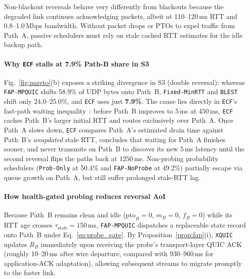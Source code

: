 \documentclass[preprint,12pt,number]{elsarticle}
\begin{document}
Non-blackout reversals behave very differently from blackouts because the degraded link continues acknowledging packets, albeit at 110--120\,ms RTT and 0.8--1.0\,Mbps bandwidth. Without packet drops or PTOs to expel traffic from Path~A, passive schedulers must rely on stale cached RTT estimates for the idle backup path.

\paragraph{Why \texttt{ECF} stalls at 7.9\% Path-B share in S3}
Fig.~\ref{fig:pareto}(b) exposes a striking divergence in S3 (double reversal): whereas \texttt{FAP-MPQUIC} shifts 58.9\% of UDP bytes onto Path~B, \texttt{Fixed-MinRTT} and \texttt{BLEST} shift only 24.0--25.0\%, and \texttt{ECF} uses just \textbf{7.9\%}. The cause lies directly in \texttt{ECF}'s fast-path waiting inequality~\cite{lim2017ecf}: before Path~B improves to $5$\,ms at $450$\,ms, \texttt{ECF} caches Path~B's larger initial RTT and routes exclusively over Path~A. Once Path~A slows down, \texttt{ECF} compares Path~A's estimated drain time against Path~B's \emph{unupdated} stale RTT, concludes that waiting for Path~A finishes sooner, and never transmits on Path~B to discover its new $5$\,ms latency until the second reversal flips the paths back at $1250$\,ms. Non-probing probability schedulers (\texttt{Prob-Only} at 50.4\% and \texttt{FAP-NoProbe} at 49.2\%) partially escape via queue growth on Path~A, but still suffer prolonged stale-RTT lag.

\paragraph{How health-gated probing reduces reversal AoI}
Because Path~B remains clean and idle ($\text{pto}_B{=}0$, $m_B{=}0$, $f_B{=}0$) while its RTT age crosses $\tau_{\text{stale}} = 150$\,ms, \texttt{FAP-MPQUIC} dispatches a replaceable state record onto Path~B under Eq.~\eqref{eq:probe_gate}. By Proposition~\ref{prop:fap}(i), \texttt{XQUIC} updates $R_B$ immediately upon receiving the probe's transport-layer QUIC ACK (roughly 10--20\,ms after wire departure, compared with 930--960\,ms for application-ACK adaptation), allowing subsequent streams to migrate promptly to the faster link.
\end{document}
